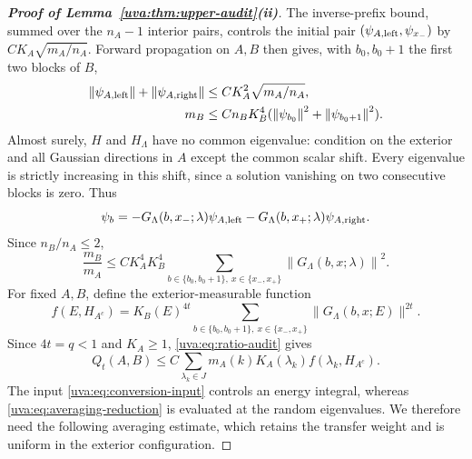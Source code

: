 \documentclass[11pt]{article}
\numberwithin{equation}{section}
\theoremstyle{remark}
\newcommand{\norm}[1]{\left\|#1\right\|}
\begin{document}
\begin{proof}[\textbf{Proof of Lemma~\ref{uva:thm:upper-audit}\textup{(ii)}}]
The inverse-prefix bound, summed over the $n_A-1$ interior pairs,
controls the initial pair $(\psi_{A,\rm left},\psi_{x_-})$ by
$CK_A\sqrt{m_A/n_A}$. Forward propagation on $A,B$ then gives,
with $b_0,b_0+1$ the first two blocks of $B$,
\[
 \begin{aligned}
 \norm{\psi_{A,\rm left}}+\norm{\psi_{A,\rm right}}
 &\le CK_A^2\sqrt{m_A/n_A},\\
 m_B&\le Cn_BK_B^4
       (\norm{\psi_{b_0}}^2+\norm{\psi_{b_0+1}}^2).
 \end{aligned}
\]
Almost surely, $H$ and $H_\Lambda$ have no common eigenvalue:
condition on the exterior and all Gaussian directions in $A$ except
the common scalar shift. Every eigenvalue is strictly increasing in
this shift, since a solution vanishing on two consecutive blocks is zero.
Thus
\[
 \psi_b=-G_\Lambda(b,x_-;\lambda)\psi_{A,\rm left}
        -G_\Lambda(b,x_+;\lambda)\psi_{A,\rm right}.
\]
Since $n_B/n_A\le2$,
\begin{equation}\label{uva:eq:ratio-audit}
 \frac{m_B}{m_A}\le CK_A^4K_B^4
       \sum_{b\in\{b_0,b_0+1\},\ x\in\{x_-,x_+\}}
                    \norm{G_\Lambda(b,x;\lambda)}^2.
\end{equation}
For fixed $A,B$, define the exterior-measurable function
\[
 f(E,H_{A^c})=K_B(E)^{4t}
       \sum_{b\in\{b_0,b_0+1\},\ x\in\{x_-,x_+\}}
                    \|G_\Lambda(b,x;E)\|^{2t}.
\]
Since $4t=q<1$ and $K_A\ge1$, \eqref{uva:eq:ratio-audit} gives
\begin{equation}\label{uva:eq:averaging-reduction}
 Q_t(A,B)\le C\sum_{\lambda_k\in J}
        m_A(k)K_A(\lambda_k)f(\lambda_k,H_{A^c}).
\end{equation}
The input \eqref{uva:eq:conversion-input} controls an energy integral,
whereas \eqref{uva:eq:averaging-reduction} is evaluated at the random
eigenvalues. We therefore need the following averaging estimate, which
retains the transfer weight and is uniform in the exterior configuration.


\end{proof}
\end{document}
